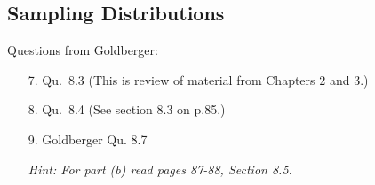 \documentclass{article}
\newcommand{\1}{\mathbf{1}}
\begin{document}
\subsection*{Sampling Distributions}

Questions from Goldberger:
\begin{enumerate}
\item[7.] Qu.~8.3 (This is review of material from Chapters 2 and 3.)
\item[8.] Qu.~8.4  (See section 8.3 on p.85.)
\item[9.]  Goldberger Qu. 8.7\par
{\it Hint: For part (b) read pages 87-88, Section 8.5.}
\end{enumerate}
\end{document}
